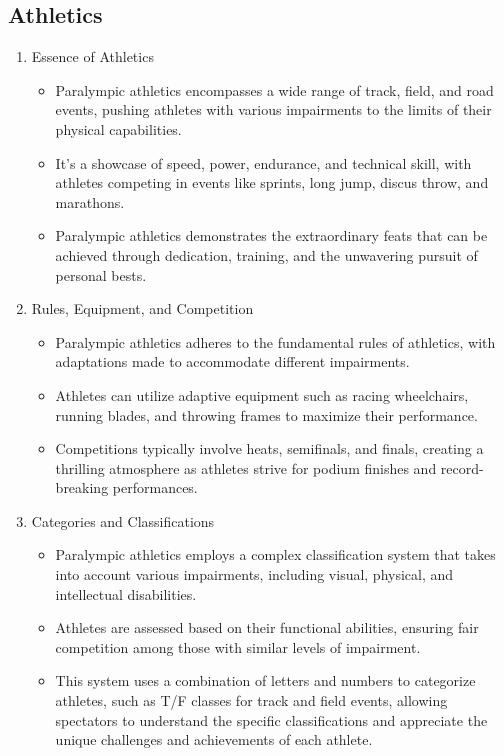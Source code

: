 \subsection{Athletics}

\begin{enumerate}

\item Essence of Athletics
    \begin{itemize}
    \item Paralympic athletics encompasses a wide range of track, field, and road events, pushing athletes with various impairments to the limits of their physical capabilities. 
    \item It's a showcase of speed, power, endurance, and technical skill, with athletes competing in events like sprints, long jump, discus throw, and marathons. 
    \item Paralympic athletics demonstrates the extraordinary feats that can be achieved through dedication, training, and the unwavering pursuit of personal bests.
    \end{itemize}

\item Rules, Equipment, and Competition
    \begin{itemize}
    \item Paralympic athletics adheres to the fundamental rules of athletics, with adaptations made to accommodate different impairments. 
    \item Athletes can utilize adaptive equipment such as racing wheelchairs, running blades, and throwing frames to maximize their performance. 
    \item Competitions typically involve heats, semifinals, and finals, creating a thrilling atmosphere as athletes strive for podium finishes and record-breaking performances.
    \end{itemize}

\item Categories and Classifications
    \begin{itemize}
    \item Paralympic athletics employs a complex classification system that takes into account various impairments, including visual, physical, and intellectual disabilities. 
    \item Athletes are assessed based on their functional abilities, ensuring fair competition among those with similar levels of impairment. 
    \item This system uses a combination of letters and numbers to categorize athletes, such as T/F classes for track and field events, allowing spectators to understand the specific classifications and appreciate the unique challenges and achievements of each athlete.
    \end{itemize}
\end{enumerate}